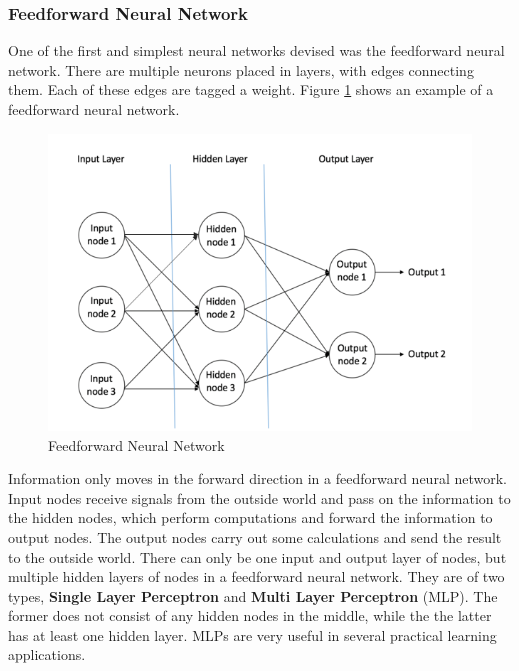 \subsubsection{Feedforward Neural Network}
\label{sect5_1_1_1}
One of the first and simplest neural networks devised was the feedforward neural network. There are multiple neurons placed in layers, with edges connecting them. Each of these edges are tagged a weight. Figure \ref{fig:cnn4} shows an example of a feedforward neural network.\newline\newline
\begin{figure}[h!]
\includegraphics[width=14cm]{figures/Feedforward_Neural_Network.png}
\caption{Feedforward Neural Network \cite{nn_karn}}
\label{fig:cnn4}
\end{figure}
Information only moves in the forward direction in a feedforward neural network. Input nodes receive signals from the outside world and pass on the information to the hidden nodes, which perform computations and forward the information to output nodes. The output nodes carry out some calculations and send the result to the outside world. There can only be one input and output layer of nodes, but multiple hidden layers of nodes in a feedforward neural network.\newline\newline 
They are of two types, \textbf{Single Layer Perceptron} and \textbf{Multi Layer Perceptron} (MLP). The former does not consist of any hidden nodes in the middle, while the the latter has at least one hidden layer. MLPs are very useful in several practical learning applications.
